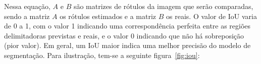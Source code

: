 Nessa equação, $A$ e $B$ são matrizes de rótulos da imagem que serão
comparadas, sendo a matriz $A$ os rótulos estimados e a matriz $B$ os
reais. O valor de IoU varia de 0 a 1, com o valor 1 indicando uma
correspondência perfeita entre as regiões delimitadoras previstas e
reais, e o valor 0 indicando que não há sobreposição (pior valor). Em
geral, um IoU maior indica uma melhor precisão do modelo de
segmentação. Para ilustração, tem-se a seguinte figura~\ref{fig:iou}:

\begin{figure}[h!]
        \captionsetup{width=12cm}
		\centering
\end{figure}
\FloatBarrier{}
